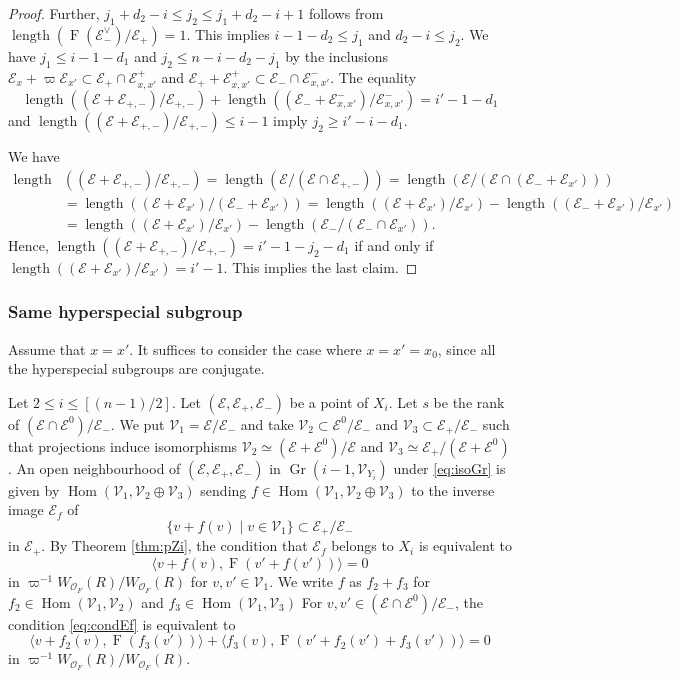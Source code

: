\documentclass[12pt,a4paper]{article}
\DeclareMathOperator{\Hom}{Hom}
\DeclareMathOperator{\length}{length}
\DeclareMathOperator{\Gr}{Gr}
\DeclareMathOperator{\oF}{F}
\newcommand{\cE}{\mathcal{E}}
\newcommand{\cO}{\mathcal{O}}
\newcommand{\cV}{\mathcal{V}}
\newcommand{\sV}{\mathscr{V}}
\begin{document}
\begin{proof}
Further, 
$j_1 +d_2 -i \leq j_2 \leq j_1 +d_2-i +1$ 
follows from $\length (\oF (\cE_-^{\vee})/\cE_+)=1$. 
This implies 
$i-1-d_2 \leq j_1$ and 
$d_2 -i \leq j_2$. 
We have 
$j_1 \leq i-1-d_1$ and 
$j_2 \leq n-i-d_2 -j_1$ 
by the inclusions 
$\cE_x +\varpi \cE_{x'} \subset \cE_+ \cap \cE_{x,x'}^+$
and 
$\cE_+ +\cE_{x,x'}^+ \subset \cE_- \cap \cE_{x,x'}^-$. 
The equality 
\[
 \length ((\cE +\cE_{+,-} )/ \cE_{+,-}) + \length ((\cE_- +\cE_{x,x'}^-)/ \cE_{x,x'}^- ) = i'-1 -d_1 
\] 
and $\length ((\cE +\cE_{+,-} )/ \cE_{+,-}) \leq i-1$ imply 
$j_2 \geq i'-i-d_1$. 

We have 
\begin{align*}
 \length & ((\cE +\cE_{+,-} )/ \cE_{+,-}) 
 = \length (\cE / (\cE \cap \cE_{+,-}))
 = \length (\cE / (\cE \cap (\cE_- + \cE_{x'} ))) \\ 
 &= \length ((\cE +\cE_{x'})/ (\cE_- + \cE_{x'} )) 
 = \length ((\cE +\cE_{x'})/ \cE_{x'} ) 
 -\length ((\cE_- + \cE_{x'} )/ \cE_{x'} ) \\ 
 &= \length ((\cE +\cE_{x'})/ \cE_{x'} ) 
 -\length (\cE_-/ (\cE_- \cap \cE_{x'} ))  . 
\end{align*}
Hence, 
$\length  ((\cE +\cE_{+,-} )/ \cE_{+,-}) = i'-1 - j_2 -d_1$ 
if and only if 
$\length ((\cE +\cE_{x'})/ \cE_{x'} ) = i'-1$. 
This implies the last claim. 
\end{proof}



\subsubsection{Same hyperspecial subgroup}
Assume that $x=x'$. 
It suffices to consider the case where $x=x'=x_0$, 
since all the hyperspecial subgroups are conjugate. 

Let $2 \leq i \leq [(n-1)/2]$. 
Let $(\cE,\cE_+,\cE_-)$ be a point of 
$X_i$. 
Let $s$ be the rank of 
$(\cE \cap \cE^0)/\cE_-$. 
We put $\cV_1=\cE/\cE_-$ 
and take 
$\cV_2 \subset \cE^0/\cE_-$ and 
$\cV_3 \subset \cE_+/\cE_-$ 
such that projections induce 
isomorphisms 
$\cV_2 \simeq (\cE+\cE^0)/\cE$ 
and 
$\cV_3 \simeq \cE_+/(\cE+\cE^0)$. 
An open neighbourhood of 
$(\cE,\cE_+,\cE_-)$ in $\Gr(i-1,\sV_{Y_i})$ 
under \eqref{eq:isoGr} 
is given by 
$\Hom (\cV_1,\cV_2 \oplus \cV_3)$ 
sending 
$f \in \Hom (\cV_1,\cV_2 \oplus \cV_3)$ 
to the inverse image $\cE_f$ of 
\[
 \{ v+f(v) \mid v \in \cV_1 \} \subset \cE_+/\cE_- 
\]
in $\cE_+$. 
By Theorem \ref{thm:pZi}, the condition that 
$\cE_f$ belongs to $X_i$ 
is equivalent to 
\begin{equation}\label{eq:condEf}
 \langle v+f(v) , \oF (v'+f(v')) \rangle =0 
\end{equation}
in $\varpi^{-1}W_{\cO_F}(R) / W_{\cO_F}(R)$ 
for $v,v' \in \cV_1$. 
We write 
$f$ as $f_2 +f_3$ for 
$f_2 \in \Hom (\cV_1,\cV_2)$ 
and 
$f_3 \in \Hom (\cV_1,\cV_3)$ 
For $v,v' \in (\cE \cap \cE^0)/\cE_-$, 
the condition \eqref{eq:condEf} 
is equivalent to 
\begin{equation}\label{eq:cond0Ef}
 \langle v +f_2(v), \oF (f_3(v')) \rangle + 
 \langle f_3(v) , \oF (v'+f_2(v')+f_3(v')) \rangle 
 =0 
\end{equation}
in $\varpi^{-1}W_{\cO_F}(R) / W_{\cO_F}(R)$. 
\end{document}
